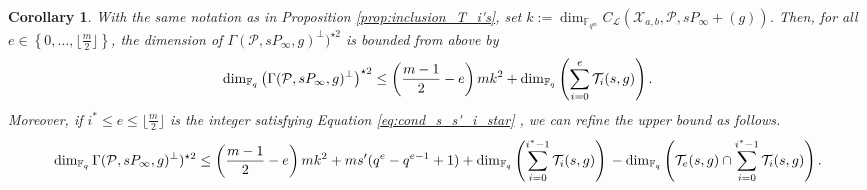 \documentclass[peerreview]{IEEEtran}
\theoremstyle{plain}
\newtheorem{coro}[thm]{Corollary}
\theoremstyle{definition}
\theoremstyle{remark}
\newcommand{\calP}{\mathcal{P}}
\newcommand{\calL}{\mathcal{L}}
\newcommand{\calT}{\mathcal{T}}
\newcommand{\calX}{\mathcal{X}}
\newcommand{\fqm}{\mathbb{F}_{q^m}}
\newcommand{\fq}{\mathbb{F}_{q}}
\newcommand{\set}[1]{\left\{#1\right\}}
\begin{document}
	\begin{coro} \label{coro:folklore_upper_bound}
		With the same notation as in Proposition \ref{prop:inclusion_T_i's}, set $k:=\dim_{\fqm}C_{\calL}(\calX_{a,b},\calP,sP_\infty+(g))$.
		Then, for all $e \in \set{0,\dots,\lfloor \frac{m}{2} \rfloor}$, the dimension of $\Gamma(\calP,sP_\infty,g)^{\perp})^{\star 2}$ is bounded from above by
\[		\dim_{\fq} \left(\Gamma(\calP,sP_\infty,g)^{\perp}\right)^{\star 2} \leq   \left(\frac{m-1}{2}-e\right)mk^2 \\+\dim_{\fq}\left(\sum\limits_{i=0}^e \calT_i(s,g) \right).\]
		Moreover, if $i^* \leq e \leq \lfloor \frac{m}{2} \rfloor$ is the integer satisfying Equation \eqref{eq:cond_s_s'_i_star} , we can refine the upper bound as follows. 
\[			\dim_{\fq} \Gamma(\calP,sP_\infty,g)^{\perp})^{\star 2} \leq  \left(\frac{m-1}{2}-e\right)mk^2 \\ + ms'(q^e-q^{e-1}+1) 
			\\+ \dim_{\fq}\left(\sum\limits_{i=0}^{i^*-1} \calT_i(s,g)\right) \\- \dim_{\fq} \left( \calT_e(s,g) \cap   \sum\limits_{i=0}^{i^*-1} \calT_i(s,g)\right).
\]
		
	\end{coro}
	
\end{document}
